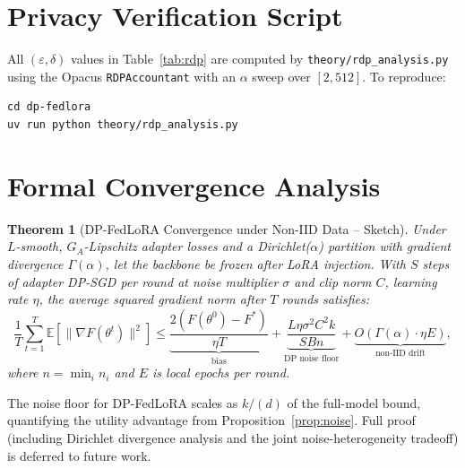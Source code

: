 ﻿\documentclass{article}
\newtheorem{theorem}{Theorem}
\newcommand{\method}{DP-FedLoRA}
\renewcommand{\eps}{\varepsilon}
\newcommand{\noise}{\sigma}
\newcommand{\clip}{C}
\begin{document}



\appendix
\section{Privacy Verification Script}
\label{app:privacy}

All $(\eps, \delta)$ values in Table~\ref{tab:rdp} are computed by
\texttt{theory/rdp\_analysis.py} using the Opacus
\texttt{RDPAccountant} with an $\alpha$ sweep over $[2, 512]$.
To reproduce:
\begin{verbatim}
cd dp-fedlora
uv run python theory/rdp_analysis.py
\end{verbatim}

\section{Formal Convergence Analysis}
\label{app:convergence}

\begin{theorem}[DP-FedLoRA Convergence under Non-IID Data -- Sketch]
\label{thm:convergence}
Under $L$-smooth, $G_A$-Lipschitz adapter losses and a Dirichlet($\alpha$)
partition with gradient divergence $\Gamma(\alpha)$, let the backbone be
frozen after LoRA injection.
With $S$ steps of adapter DP-SGD per round at noise multiplier $\noise$
and clip norm $\clip$, learning rate $\eta$, the average squared gradient
norm after $T$ rounds satisfies:
\[
  \frac{1}{T}\sum_{t=1}^T \mathbb{E}\left[\|\nabla F(\theta^t)\|^2\right]
  \leq \underbrace{\frac{2(F(\theta^0) - F^*)}{\eta T}}_{\text{bias}}
     + \underbrace{\frac{L\eta \noise^2 \clip^2 k}{S B n}}_{\text{DP noise floor}}
     + \underbrace{O(\Gamma(\alpha) \cdot \eta E)}_{\text{non-IID drift}},
\]
where $n = \min_i n_i$ and $E$ is local epochs per round.
\end{theorem}

The noise floor for \method{} scales as $k/(d)$ of the full-model bound,
quantifying the utility advantage from Proposition~\ref{prop:noise}.
Full proof (including Dirichlet divergence analysis and the joint
noise-heterogeneity tradeoff) is deferred to future work.
\end{document}
